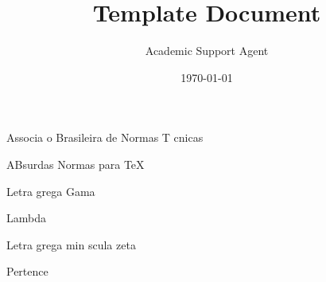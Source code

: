 \documentclass{article}
\title{Template Document}
\author{Academic Support Agent}
\date{\today}
\begin{document}
\maketitle

\frenchspacing

\pretextual



\imprimirfolhaderosto*



















\begin{siglas}
  \item[ABNT] Associa o Brasileira de Normas T cnicas
  \item[abnTeX] ABsurdas Normas para TeX
\end{siglas}

\begin{simbolos}
  \item[$ \Gamma $] Letra grega Gama
  \item[$ \Lambda $] Lambda
  \item[$ \zeta $] Letra grega min scula zeta
  \item[$ \in $] Pertence
\end{simbolos}
\end{document}
